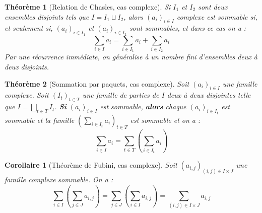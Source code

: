 \documentclass[french]{book}
\theoremstyle{plain}
\newtheorem{thm}{Théorème}[chapter]
\newtheorem{cor}{Corollaire}[chapter]
\theoremstyle{definition}
\theoremstyle{remark}
\begin{document}
\begin{thm}[Relation de Chasles, cas complexe]
	Si $I_1$ et $I_2$ sont deux ensembles disjoints tels que $I=I_1\sqcup I_2$, alors $(a_i)_{i\in I}$ complexe est sommable si, et seulement si, $(a_i)_{i\in I_1}$ et $(a_i)_{i\in I_2}$ sont sommables, et dans ce cas on a : $$\sum_{i\in I}a_i=\sum_{i\in I_1}a_i+\sum_{i\in I_2}a_i$$ Par une récurrence immédiate, on généralise à un nombre fini d'ensembles deux à deux disjoints.
\end{thm}
\begin{thm}[Sommation par paquets, cas complexe]
	Soit $(a_i)_{i\in I}$ une famille complexe. Soit $(I_t)_{t\in T}$ une famille de parties de $I$ deux à deux disjointes telle que $\displaystyle I=\bigsqcup_{t\in T}I_t$. \textbf{Si} $(a_i)_{i\in I}$ est sommable, \textbf{alors} chaque $(a_i)_{i\in I_t}$ est sommable et la famille $\displaystyle \left(\sum_{i\in I_t}a_i\right)_{t\in T}$ est sommable et on a : $$\sum_{i\in I}a_i=\sum_{t\in T}\left(\sum_{i\in I_t}a_i\right)$$
\end{thm}
\begin{cor}[Théorème de Fubini, cas complexe]
	Soit $(a_{i,j})_{(i,j)\in I\times J}$  une famille complexe sommable. On a : $$\sum_{i\in I}\left(\sum_{j\in J}a_{i,j}\right)=\sum_{j\in J}\left(\sum_{i\in I}a_{i,j}\right)=\sum_{(i,j)\in I\times J}a_{i,j}$$
\end{cor}
\end{document}
